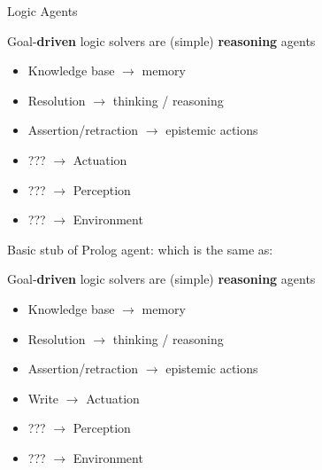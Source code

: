 \documentclass[presentation]{beamer}\mode<presentation>{\usetheme{AMSBolognaFC}}
\begin{document}
\begin{frame}[allowframebreaks]{Logic Agents}
    \begin{block}{Goal-\textbf{driven} logic solvers are (simple) \textbf{reasoning} agents}
        \begin{itemize}
            \item Knowledge base $\rightarrow$ memory
            \item Resolution $\rightarrow$ thinking / reasoning
            \item Assertion/retraction $\rightarrow$ epistemic actions
            \item ??? $\rightarrow$ Actuation
            \item ??? $\rightarrow$ Perception
            \item ??? $\rightarrow$ Environment
        \end{itemize}
    \end{block}

    \framebreak

    Basic stub of Prolog agent:
    which is the same as:

    \begin{block}{Goal-\textbf{driven} logic solvers are (simple) \textbf{reasoning} agents}
        \begin{itemize}
            \item Knowledge base $\rightarrow$ memory
            \item Resolution $\rightarrow$ thinking / reasoning
            \item Assertion/retraction $\rightarrow$ epistemic actions
            \item \alert{Write $\rightarrow$ Actuation}
            \item ??? $\rightarrow$ Perception
            \item ??? $\rightarrow$ Environment
        \end{itemize}
    \end{block}
\end{frame}
\end{document}
